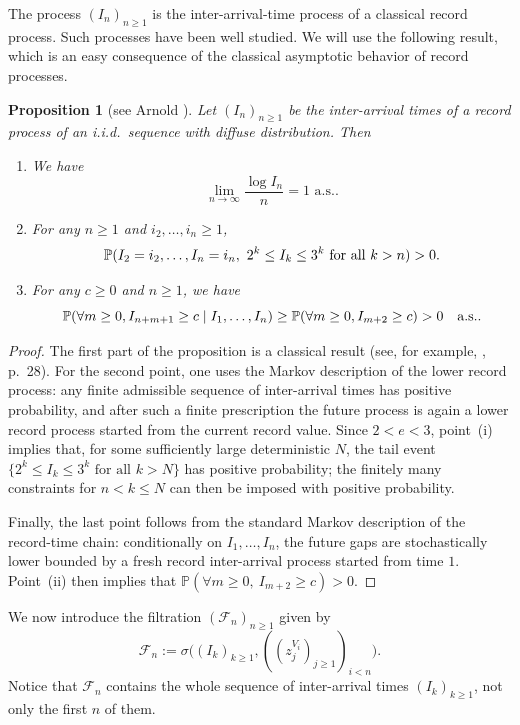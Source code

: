\documentclass[french]{article}
\newcommand{\zi}{z}
\newtheorem{prop}[theorem]{Proposition}
\renewcommand{\P}{\mathbb{P}}
\renewcommand{\1}{\mathds{1}}
\begin{document}
The process $(I_n)_{n\ge 1}$ is the inter-arrival-time process of a classical record process. Such processes have been well studied. We will use the following result, which is an easy consequence of the classical asymptotic behavior of record processes.

\begin{prop}[see Arnold \cite{arnold2011}]\label{prop:Arnold} Let $(I_n)_{n\ge 1}$ be the inter-arrival times of a record process of an i.i.d.\ sequence with diffuse distribution. Then
\begin{enumerate}
    \item[(i)] We have $$\lim_{n\to \infty } \frac{\log I_n}{n}=1 \mbox{ a.s.}.$$
    \item[(ii)] For any $n\ge 1$ and $i_2,\ldots,i_n\ge 1$,
$$\P(I_2=i_2,\ldots, I_n=i_n,\ 2^{k}\le I_k\le 3^{k} \hbox{ for all } k> n)>0.$$
    \item[(iii)] For any $c\ge 0$ and $n\ge 1$, we have $$\P(\forall m\ge 0, I_{n+m+1}\ge c \mid I_1,\ldots,I_n)\ge \P(\forall m\ge 0, I_{m+2}\ge c)>0 \quad\hbox{a.s.}.$$
\end{enumerate}
\end{prop}

\begin{proof}
The first part of the proposition is a classical result (see, for example, \cite{arnold2011}, p.~28). For the second point, one uses the Markov description of the lower record process: any finite admissible sequence of inter-arrival times has positive probability, and after such a finite prescription the future process is again a lower record process started from the current record value. Since \(2<e<3\), point~(i) implies that, for some sufficiently large deterministic \(N\), the tail event \(\{2^k\le I_k\le 3^k \text{ for all } k>N\}\) has positive probability; the finitely many constraints for \(n<k\le N\) can then be imposed with positive probability.

Finally, the last point follows from the standard Markov description of the record-time chain: conditionally on \(I_1,\ldots,I_n\), the future gaps are stochastically lower bounded by a fresh record inter-arrival process started from time \(1\). Point~(ii) then implies that
$\P(\forall m \ge 0,\ I_{m+2} \ge c) > 0$.
\end{proof}



We now introduce the filtration $(\mathcal{F}_n)_{n\ge 1}$ given by 
\begin{equation}\label{eq:defFn}
    \mathcal{F}_n:=\sigma\bigl((I_k)_{k\ge 1}, ((\zi_j^{V_i})_{j\ge 1})_{i< n}\bigr).
\end{equation}
Notice that $\mathcal{F}_n$ contains the whole sequence of inter-arrival times $(I_k)_{k\ge 1}$, not only the first $n$ of them.
\end{document}
